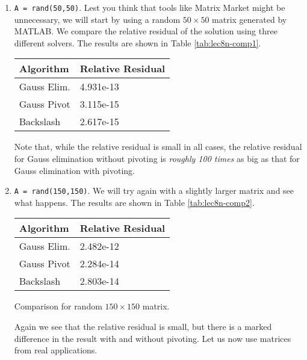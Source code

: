 \begin{enumerate}
\item \lstinline[style=myMatlab]{A = rand(50,50)}.  Lest you think that tools like Matrix Market might be unnecessary, we will start by using a random $50 \times 50$ matrix generated by MATLAB.  We compare the relative residual of the solution using three different solvers.  The results are shown in Table \ref{tab:lec8n-comp1}.
\begin{margintable}
\begin{tabular}{|l | l |}
\hline
\textbf{Algorithm} & \textbf{Relative Residual} \\ \hline
Gauss Elim. & 4.931e-13 \\ \hline
Gauss Pivot & 3.115e-15 \\ \hline
Backslash & 2.617e-15 \\ \hline
\end{tabular}
\caption{Comparison for random $50 \times 50$ matrix.}
\label{tab:lec8n-comp1}
\end{margintable} 
Note that, while the relative residual is small in all cases, the relative residual for Gauss elimination without pivoting is \emph{roughly 100 times} as big as that for Gauss elimination with pivoting.

\item \lstinline[style=myMatlab]{A = rand(150,150)}.  We will try again with a slightly larger matrix and see what happens.  The results are shown in Table \ref{tab:lec8n-comp2}.
\begin{margintable}
\begin{tabular}{|l | l |}
\hline
\textbf{Algorithm} & \textbf{Relative Residual} \\ \hline
Gauss Elim. & 2.482e-12 \\ \hline
Gauss Pivot & 2.284e-14 \\ \hline
Backslash & 2.803e-14 \\ \hline
\end{tabular}
\caption{Comparison for random $150 \times 150$ matrix.}
\label{tab:lec8n-comp2}
\end{margintable}
Again we see that the relative residual is small, but there is a marked difference in the result with and without pivoting. Let us now use matrices from real applications.


\end{enumerate}
